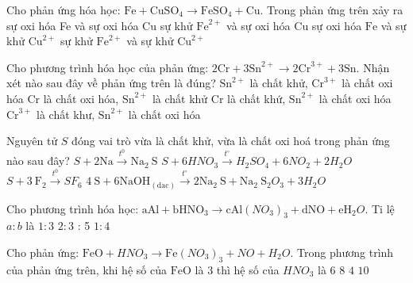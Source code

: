 \begin{ex}[Đề TSCĐ-2008]
	Cho phản ứng hóa học: $\mathrm{Fe}+\mathrm{CuSO}_4\to \mathrm{FeSO}_4+\mathrm{Cu}$. Trong phản ứng trên xảy ra
	\choice
	{sự oxi hóa Fe và sự oxi hóa $\mathrm{Cu}$}
	{\True sự khử $\mathrm{Fe}^{2+}$ và sự oxi hóa $\mathrm{Cu}$}
	{sự oxi hóa $\mathrm{Fe}$ và sự khử $\mathrm{Cu}^{2+}$}
	{sự khử $\mathrm{Fe}^{2+}$ và sự khử $\mathrm{Cu}^{2+}$}
	\loigiai{}
\end{ex}

\begin{ex}[Đề TSĐH B-2013]
	Cho phương trình hóa học của phản ứng:
	$2\mathrm{Cr}+3\mathrm{Sn}^{2+} \to 2\mathrm{Cr}^{3+}+3\mathrm{Sn}$. Nhận xét nào sau đây về phản ứng trên là đúng?
	\choice
	{$\mathrm{Sn}^{2+}$ là chất khử, $\mathrm{Cr}^{3+}$ là chất oxi hóa}
	{Cr là chất oxi hóa, $\mathrm{Sn}^{2+}$ là chất khử}
	{Cr là chất khứ, $\mathrm{Sn}^{2+}$ là chất oxi hóa}
	{\True $\mathrm{Cr}^{3+}$ là chất khư, $\mathrm{Sn}^{2+}$ là chất oxi hóa}
	\loigiai{}
\end{ex}

\begin{ex}[Đề TSCĐ-2010]
	Nguyên tử $S$ đóng vai trò vừa là chất khử, vừa là chất oxi hoá trong phản ứng nào sau đây?
	\choice
	{$S+2\mathrm{Na} \xrightarrow{t^0} \mathrm{Na}_2\mathrm{~S}$}
	{$S+6 HNO_3 \xrightarrow{t^{\circ}} H_2SO_4+6 NO_2+2 H_2O$}
	{\True $S+3\mathrm{~F}_2\xrightarrow{t^0} SF_6$}
	{$4 \mathrm{~S}+6 \mathrm{NaOH}_{(\mathrm{dac})} \xrightarrow{t^{\circ}} 2 \mathrm{Na}_2 \mathrm{~S}+\mathrm{Na}_2 \mathrm{~S}_2 O_3+3 H_2O$}
	\loigiai{}
\end{ex}

\begin{ex}[Đề TSĐH A-2013]
	Cho phương trình hóa học:
	$\mathrm{aAl}+\mathrm{bHNO}_3\to \mathrm{cAl}\left(NO_3\right)_3+\mathrm{dNO}+\mathrm{eH}_2O$. Ti lệ $a: b$ là
	\choice
	{$1: 3$}
	{$2: 3$}
	{: 5}
	{$1: 4$}
	\loigiai{}
\end{ex}

\begin{ex}[Đề TSĐH B-2013]
	Cho phản ứng: $\mathrm{FeO}+HNO_3 \to \mathrm{Fe}\left(NO_3\right)_3+NO+H_2O$. Trong phương trình của phản ứng trên, khi hệ số của $\mathrm{FeO}$ là 3 thì hệ số của $HNO_3$ là
	\choice
	{$6$}
	{$8$}
	{$4$}
	{\True $10$}
	\loigiai{}
\end{ex}

